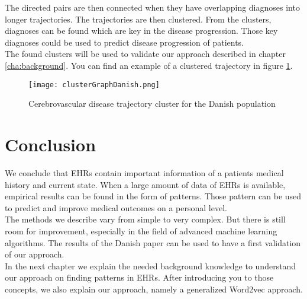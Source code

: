 The directed pairs are then connected when they have overlapping diagnoses into longer trajectories. The trajectories are then clustered. From the clusters, diagnoses can be found which are key in the disease progression. Those key diagnoses could be used to predict disease progression of patients. \\

The found clusters will be used to validate our approach described in chapter \ref{cha:background}. You can find an example of a clustered trajectory in figure \ref{fig:clusterGraphDanish}.

\begin{figure}[H]
	\centering
	\texttt{[image: clusterGraphDanish.png]}
	\caption{Cerebrovascular disease trajectory cluster for the Danish population \cite{Brunak:article}}
	\label{fig:clusterGraphDanish}
\end{figure}


\section{Conclusion}

We conclude that EHRs contain important information of a patients medical history and current state. When a large amount of data of EHRs is available, empirical results can be found in the form of patterns. Those pattern can be used to predict and improve medical outcomes on a personal level. \\
The methods we describe vary from simple to very complex. But there is still room for improvement, especially in the field of advanced machine learning algorithms. The results of the Danish paper can be used to have a first validation of our approach. \\

In the next chapter we explain the needed background knowledge to understand our approach on finding patterns in EHRs. After introducing you to those concepts, we also explain our approach, namely a generalized Word2vec approach.


